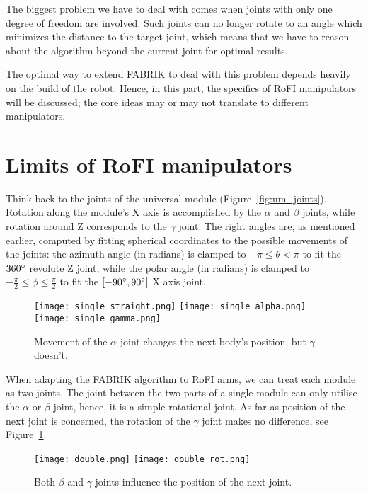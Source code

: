 The biggest problem we have to deal with comes when joints with only one degree of freedom are involved. Such joints can no longer rotate to an angle which minimizes the distance to the target joint, which means that we have to reason about the algorithm beyond the current joint for optimal results.

The optimal way to extend FABRIK to deal with this problem depends heavily on the build of the robot. Hence, in this part, the specifics of RoFI manipulators will be discussed; the core ideas may or may not translate to different manipulators.

\section{Limits of RoFI manipulators}

Think back to the joints of the universal module (Figure~\ref{fig:um_joints}). Rotation along the module's X axis is accomplished by the $\alpha$ and $\beta$ joints, while rotation around Z corresponds to the $\gamma$ joint. The right angles are, as mentioned earlier, computed by fitting spherical coordinates to the possible movements of the joints: the azimuth angle (in radians) is clamped to $-\pi \le \theta < \pi$ to fit the $360\degree$ revolute Z joint, while the polar angle (in radians) is clamped to $-\frac{\pi}{2} \le \phi \le \frac{\pi}{2}$ to fit the $\left[-90\degree, 90\degree\right]$ X axis joint.

\begin{figure}[ht]
  \centering
  \begin{minipage}{0.5\textwidth}
    \texttt{[image: single\_straight.png]}
    \texttt{[image: single\_alpha.png]}
    \texttt{[image: single\_gamma.png]}
  \end{minipage}
  \caption{Movement of the $\alpha$ joint changes the next body's position, but $\gamma$ doesn't.}\label{fig:module_rot}
\end{figure}

When adapting the FABRIK algorithm to RoFI arms, we can treat each module as two joints. The joint between the two parts of a single module can only utilise the $\alpha$ or $\beta$ joint, hence, it is a simple rotational joint. As far as position of the next joint is concerned, the rotation of the $\gamma$ joint makes no difference, see Figure~\ref{fig:module_rot}.

\begin{figure}[ht]
  \centering
  \begin{minipage}{0.4\textwidth}
    \texttt{[image: double.png]}
    \texttt{[image: double\_rot.png]}
  \end{minipage}
  \caption{Both $\beta$ and $\gamma$ joints influence the position of the next joint.}\label{fig:intermodule_rot}
\end{figure}

